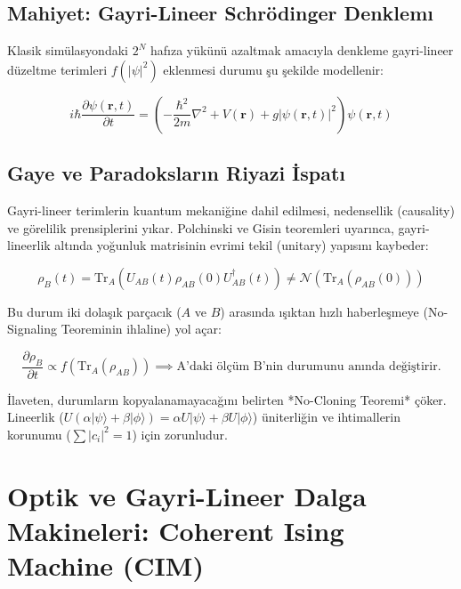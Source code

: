 \documentclass[11pt, a4paper]{article}
\begin{document}
\subsection{Mahiyet: Gayri-Lineer Schrödinger Denklemı}
Klasik simülasyondaki $2^N$ hafıza yükünü azaltmak amacıyla denkleme gayri-lineer düzeltme terimleri $f(|\psi|^2)$ eklenmesi durumu şu şekilde modellenir:

\begin{equation}
i\hbar \frac{\partial \psi(\mathbf{r}, t)}{\partial t} = \left( -\frac{\hbar^2}{2m} \nabla^2 + V(\mathbf{r}) + g |\psi(\mathbf{r}, t)|^2 \right) \psi(\mathbf{r}, t)
\end{equation}

\subsection{Gaye ve Paradoksların Riyazi İspatı}
Gayri-lineer terimlerin kuantum mekaniğine dahil edilmesi, nedensellik (causality) ve görelilik prensiplerini yıkar. Polchinski ve Gisin teoremleri uyarınca, gayri-lineerlik altında yoğunluk matrisinin evrimi tekil (unitary) yapısını kaybeder:

\begin{equation}
\rho_B(t) = \text{Tr}_A \left( U_{AB}(t) \rho_{AB}(0) U_{AB}^\dagger(t) \right) \neq \mathcal{N} \left( \text{Tr}_A (\rho_{AB}(0)) \right)
\end{equation}

Bu durum iki dolaşık parçacık ($A$ ve $B$) arasında ışıktan hızlı haberleşmeye (No-Signaling Teoreminin ihlaline) yol açar:

\begin{equation}
\frac{\partial \rho_B}{\partial t} \propto f\left( \text{Tr}_A (\rho_{AB}) \right) \implies \text{A'daki ölçüm B'nin durumunu anında değiştirir.}
\end{equation}

İlaveten, durumların kopyalanamayacağını belirten *No-Cloning Teoremi* çöker. Lineerlik ($U(\alpha|\psi\rangle + \beta|\phi\rangle) = \alpha U|\psi\rangle + \beta U|\phi\rangle$) üniterliğin ve ihtimallerin korunumu ($\sum |c_i|^2 = 1$) için zorunludur.

\section{Optik ve Gayri-Lineer Dalga Makineleri: Coherent Ising Machine (CIM)}
\end{document}

